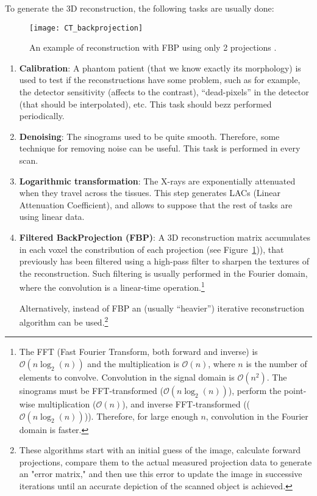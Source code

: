 To generate the 3D reconstruction, the following tasks are usually done:

\begin{figure}
  \centering
  \texttt{[image: CT\_backprojection]}
  \caption{An example of reconstruction with FBP using only 2
    projections
    \cite{abdulla2025acquiring2}.\label{fig:CT_reconstruction}}
\end{figure}

\begin{enumerate}
\item \textbf{Calibration}: A phantom patient (that we know exactly
  its morphology) is used to test if the reconstructions have some
  problem, such as for example, the detector sensitivity (affects to
  the contrast), ``dead-pixels'' in the detector (that should be
  interpolated), etc. This task should bezz performed periodically.
\item \textbf{Denoising}: The sinograms used to be quite
  smooth. Therefore, some technique for removing noise can be
  useful. This task is performed in every scan.
\item \textbf{Logarithmic transformation}: The X-rays are
  exponentially attenuated when they travel across the tissues. This
  step generates LACs (Linear Attenuation Coefficient), and allows to
  suppose that the rest of tasks are using linear data.
\item \textbf{Filtered BackProjection (FBP)}: A 3D reconstruction
  matrix accumulates in each voxel the constribution of each
  projection \cite{abdulla2025acquiring2} (see
  Figure~\ref{fig:CT_reconstruction})), that previously has been
  filtered using a high-pass filter to sharpen the textures of the
  reconstruction. Such filtering is usually performed in the Fourier
  domain, where the convolution is a linear-time
  operation.\footnote{The FFT (Fast Fourier Transform, both forward
    and inverse) is $\mathcal{O}(n\log_2(n))$ and the multiplication
    is $\mathcal{O}(n)$, where $n$ is the number of elements to
    convolve. Convolution in the signal domain is
    $\mathcal{O}(n^2)$. The sinograms must be FFT-transformed
    ($\mathcal{O}(n\log_2(n))$), perform the point-wise multiplication
    ($\mathcal{O}(n)$), and inverse FFT-transformed
    (($\mathcal{O}(n\log_2(n))$)). Therefore, for large enough $n$,
    convolution in the Fourier domain is faster.}

  Alternatively, instead of FBP an (usually ``heavier'') iterative
  reconstruction algorithm can be used.\footnote{These algorithms
    start with an initial guess of the image, calculate forward
    projections, compare them to the actual measured projection data
    to generate an "error matrix," and then use this error to update
    the image in successive iterations until an accurate depiction of
    the scanned object is achieved.}
  

\end{enumerate}
